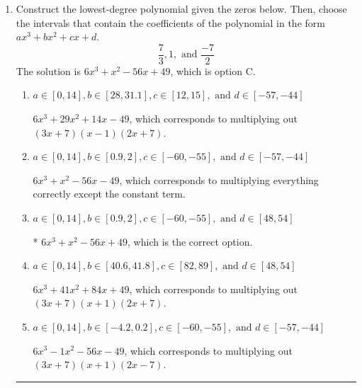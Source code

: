 \documentclass{extbook}[14pt]
\newcommand{\litem}[1]{\item #1

\rule{\textwidth}{0.4pt}}
\begin{document}
\begin{enumerate}\litem{
Construct the lowest-degree polynomial given the zeros below. Then, choose the intervals that contain the coefficients of the polynomial in the form $ax^3+bx^2+cx+d$.
\[ \frac{7}{3}, 1, \text{ and } \frac{-7}{2} \]The solution is \( 6x^{3} + x^{2} -56 x + 49 \), which is option C.\begin{enumerate}[label=\Alph*.]
\item \( a \in [0, 14], b \in [28, 31.1], c \in [12, 15], \text{ and } d \in [-57, -44] \)

$6x^{3} +29 x^{2} +14 x -49$, which corresponds to multiplying out $(3x + 7)(x -1)(2x + 7)$.
\item \( a \in [0, 14], b \in [0.9, 2], c \in [-60, -55], \text{ and } d \in [-57, -44] \)

$6x^{3} + x^{2} -56 x -49$, which corresponds to multiplying everything correctly except the constant term.
\item \( a \in [0, 14], b \in [0.9, 2], c \in [-60, -55], \text{ and } d \in [48, 54] \)

* $6x^{3} + x^{2} -56 x + 49$, which is the correct option.
\item \( a \in [0, 14], b \in [40.6, 41.8], c \in [82, 89], \text{ and } d \in [48, 54] \)

$6x^{3} +41 x^{2} +84 x + 49$, which corresponds to multiplying out $(3x + 7)(x + 1)(2x + 7)$.
\item \( a \in [0, 14], b \in [-4.2, 0.2], c \in [-60, -55], \text{ and } d \in [-57, -44] \)

$6x^{3} -1 x^{2} -56 x -49$, which corresponds to multiplying out $(3x + 7)(x + 1)(2x -7)$.
\end{enumerate}

}
\end{enumerate}
\end{document}
